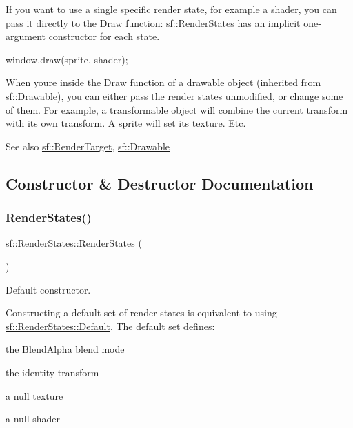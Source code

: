 If you want to use a single specific render state, for example a shader, you can pass it directly to the Draw function\+: \hyperlink{classsf_1_1_render_states}{sf\+::\+Render\+States} has an implicit one-\/argument constructor for each state. 
\begin{DoxyCode}
window.draw(sprite, shader);
\end{DoxyCode}


When you\textquotesingle{}re inside the Draw function of a drawable object (inherited from \hyperlink{classsf_1_1_drawable}{sf\+::\+Drawable}), you can either pass the render states unmodified, or change some of them. For example, a transformable object will combine the current transform with its own transform. A sprite will set its texture. Etc.

\begin{DoxySeeAlso}{See also}
\hyperlink{classsf_1_1_render_target}{sf\+::\+Render\+Target}, \hyperlink{classsf_1_1_drawable}{sf\+::\+Drawable} 
\end{DoxySeeAlso}


\subsection{Constructor \& Destructor Documentation}
\mbox{\label{classsf_1_1_render_states_a885bf14070d0d5391f062f62b270b7d0}} 
\subsubsection{\texorpdfstring{Render\+States()}{RenderStates()}\hspace{0.1cm}{\footnotesize\ttfamily [1/6]}}
{\footnotesize\ttfamily sf\+::\+Render\+States\+::\+Render\+States (\begin{DoxyParamCaption}{ }\end{DoxyParamCaption})}



Default constructor. 

Constructing a default set of render states is equivalent to using \hyperlink{classsf_1_1_render_states_ad29672df29f19ce50c3021d95f2bb062}{sf\+::\+Render\+States\+::\+Default}. The default set defines\+: \begin{DoxyItemize}
\item the Blend\+Alpha blend mode \item the identity transform \item a null texture \item a null shader \end{DoxyItemize}
\mbox{\label{classsf_1_1_render_states_acac8830a593c8a4523ac2fdf3cac8a01}} 
